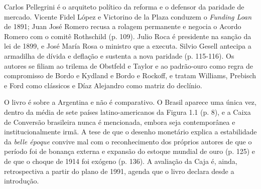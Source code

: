 Carlos Pellegrini é o arquiteto político da reforma e o defensor da paridade de
mercado. Vicente Fidel López e Victorino de la Plaza conduzem o \emph{Funding
Loan} de 1891; Juan José Romero recusa a rolagem permanente e negocia o Acordo
Romero com o comitê Rothschild (p. 109). Julio Roca é presidente na sanção da
lei de 1899, e José María Rosa o ministro que a executa. Silvio Gesell antecipa
a armadilha de dívida e deflação e sustenta a nova paridade (p. 115-116). Os
autores se filiam ao trilema de Obstfeld e Taylor e ao padrão-ouro como regra
de compromisso de Bordo e Kydland e Bordo e Rockoff, e tratam Williams,
Prebisch e Ford como clássicos e Díaz Alejandro como matriz do declínio.

O livro é sobre a Argentina e não é comparativo. O Brasil aparece uma única
vez, dentro da média de sete países latino-americanos da Figura 1.1 (p. 8), e a
Caixa de Conversão brasileira nunca é mencionada, embora seja contemporânea e
institucionalmente irmã. A tese de que o desenho monetário explica a
estabilidade da \emph{belle époque} convive mal com o reconhecimento dos
próprios autores de que o período foi de bonança externa e expansão do estoque
mundial de ouro (p. 125) e de que o choque de 1914 foi exógeno (p. 136). A
avaliação da Caja é, ainda, retrospectiva a partir do plano de 1991, agenda que
o livro declara desde a introdução.

